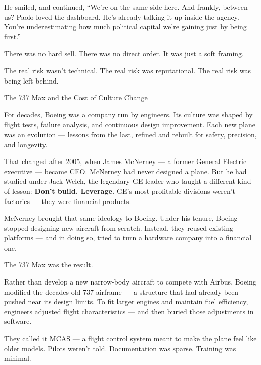 He smiled, and continued, ``We’re on the same side here. And frankly, between us? Paolo loved the dashboard. He’s already 
talking it up inside the agency. You’re underestimating how much political capital we’re gaining just by being first.''

There was no hard sell. There was no direct order.  It was just a soft framing.  

The real risk wasn’t technical.  
The real risk was reputational.  
The real risk was being left behind.

\begin{HistoricalSidebar}{The 737 Max and the Cost of Culture Change}

  For decades, Boeing was a company run by engineers.  
  Its culture was shaped by flight tests, failure analysis, and continuous design improvement.  
  Each new plane was an evolution — lessons from the last, refined and rebuilt for safety, precision, and longevity.
  
  \medskip
  
  That changed after 2005, when James McNerney — a former General Electric executive — became CEO.  
  McNerney had never designed a plane. But he had studied under Jack Welch, the legendary GE leader who taught a 
  different kind of lesson:  
  \textbf{Don’t build. Leverage.}  
  GE’s most profitable divisions weren’t factories — they were financial products.
  
  \medskip
  
  McNerney brought that same ideology to Boeing.  
  Under his tenure, Boeing stopped designing new aircraft from scratch.  
  Instead, they reused existing platforms — and in doing so, tried to turn a hardware company into a financial one.
  
  \medskip
  
  The 737 Max was the result.
  
  \medskip
  
  Rather than develop a new narrow-body aircraft to compete with Airbus, Boeing modified the decades-old 737 airframe — 
  a structure that had already been pushed near its design limits.  
  To fit larger engines and maintain fuel efficiency, engineers adjusted flight characteristics — and then buried those 
  adjustments in software.
  
  \medskip
  
  They called it MCAS — a flight control system meant to make the plane feel like older models.  
  Pilots weren’t told. Documentation was sparse. Training was minimal.
  

\end{HistoricalSidebar}
